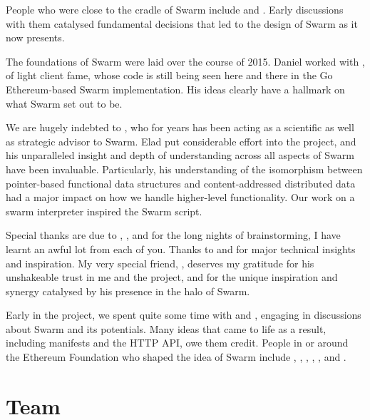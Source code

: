 People who were close to the cradle of Swarm include  and . Early discussions with them catalysed fundamental decisions that led to the design of Swarm as it now presents.

The foundations of Swarm were laid over the course of 2015.
Daniel worked with , of light client fame, whose code is still being seen here and there in the Go Ethereum-based Swarm implementation. His ideas clearly have a hallmark on what Swarm set out to be. 

We are hugely indebted to , who for years has been acting as a scientific as well as strategic advisor to Swarm. Elad put considerable effort into the project, and his unparalleled insight and depth of understanding across all aspects of Swarm have been invaluable. Particularly, his understanding of the isomorphism between pointer-based functional data structures and content-addressed distributed data had a major impact on how we handle higher-level functionality. Our work on a swarm interpreter inspired the Swarm script.

Special thanks are due to , , and  for the long nights of brainstorming, I have learnt an awful lot from each of you. Thanks to  and  for major technical insights and inspiration.
My very special friend, , deserves my gratitude for his unshakeable trust in me and the project, and for the unique inspiration and synergy catalysed by his presence in the halo of Swarm.

Early in the project, we spent quite some time with  and , engaging in discussions about Swarm and its potentials. Many ideas that came to life as a result, including manifests and the HTTP API, owe them credit. People in or around the Ethereum Foundation who shaped the idea of Swarm include , , , , , and . 

\section*{Team}


